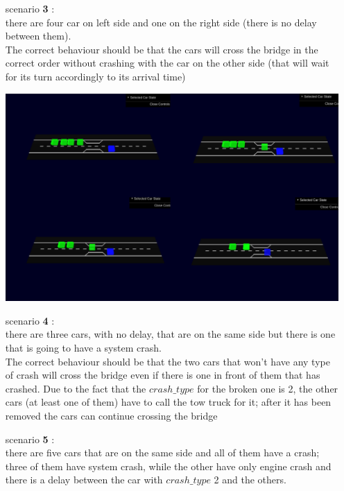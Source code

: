 \begin{itemize}
\begin{center}
    \end{center}
    \item[scenario \textbf{3}]: \\ there are four car on left side and one on the right side (there is no delay 
    between them).\\ The correct behaviour should be that the cars will cross the bridge in the correct 
    order without crashing with the car on the other side (that will wait for its turn accordingly
    to its arrival time) \\
    \begin{center}
        \includegraphics[scale=0.3, width=\linewidth]{assets/sc3.jpg}
    \end{center}
    \item[scenario \textbf{4}]: \\ there are three cars, with no delay, that are on the same side but there is one that is going to
    have a system crash.\\ The correct behaviour should be that the two cars that won't have any type of crash
    will cross the bridge even if there is one in front of them that has crashed. Due to the fact that the 
    $crash\_type$ for the broken one is 2, the other cars (at least one of them) have to call the tow truck for 
    it; after it has been removed the cars can continue crossing the bridge
    \item[scenario \textbf{5}]: \\ there are five cars that are on the same side and all of them have a crash; three of them have system crash, 
    while the other have only engine crash and there is a delay between the car with $crash\_type$ 2 and the others.\\

\end{itemize}
